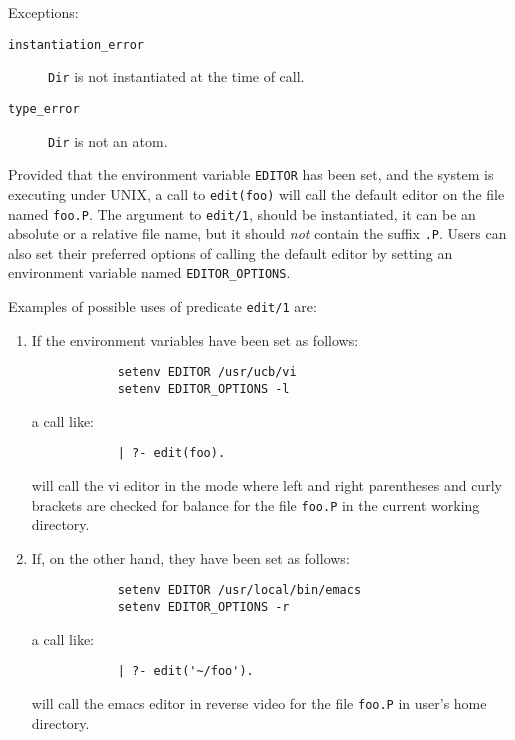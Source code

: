 \begin{description}
    Exceptions:
    \begin{description}
    \item[{\tt instantiation\_error}]
	{\tt Dir} is not instantiated at the time of call.
    \item[{\tt type\_error}]
	{\tt Dir} is not an atom.
    \end{description}

    Provided that the environment variable {\tt EDITOR} has been set,
    and the system is executing under UNIX, 
    a call to {\tt edit(foo)} will call the default editor on the file
    named {\tt foo.P}.  The argument to {\tt edit/1}, should be instantiated,
    it can be an absolute or a relative file name, but it should {\em not}
    contain the suffix {\tt .P}.  Users can also set their preferred options
    of calling the default editor by setting an environment variable named
    {\tt EDITOR\_OPTIONS}.

    Examples of possible uses of predicate {\tt edit/1} are:
    \begin{enumerate}
    \item If the environment variables have been set as follows:
          \begin{verbatim}
	        setenv EDITOR /usr/ucb/vi
	        setenv EDITOR_OPTIONS -l
          \end{verbatim}
          a call like:
          \begin{verbatim}
	        | ?- edit(foo).
          \end{verbatim}
          will call the vi editor in the mode where left and right parentheses
	  and curly brackets are checked for balance for the file {\tt foo.P}
	  in the current working directory.
    \item If, on the other hand, they have been set as follows:
          \begin{verbatim}
	        setenv EDITOR /usr/local/bin/emacs
	        setenv EDITOR_OPTIONS -r
          \end{verbatim}
          a call like:
          \begin{verbatim}
	        | ?- edit('~/foo').
          \end{verbatim}
          will call the emacs editor in reverse video for the file {\tt foo.P}
	  in user's home directory.
    \end{enumerate}

\end{description}

